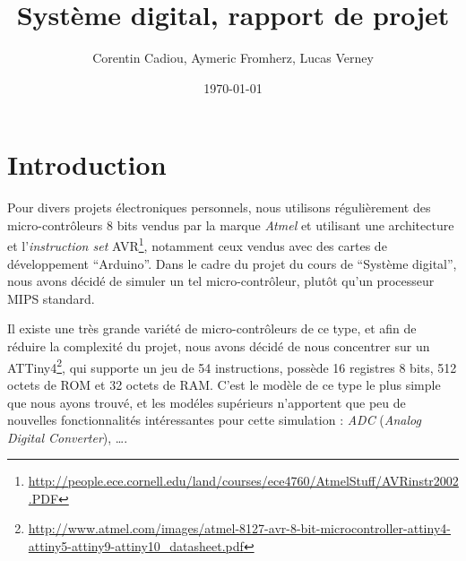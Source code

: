 \documentclass[11pt]{article}
\author{Corentin Cadiou, Aymeric Fromherz, Lucas Verney}
\date{\today}
\title{Système digital, rapport de projet}
\begin{document}
\maketitle
\section*{Introduction}
Pour divers projets électroniques personnels, nous utilisons régulièrement des micro-contrôleurs 8 bits vendus par la marque \emph{Atmel} et utilisant une architecture et l'\emph{instruction set} AVR\footnote{\url{http://people.ece.cornell.edu/land/courses/ece4760/AtmelStuff/AVRinstr2002.PDF}}, notamment ceux vendus avec des cartes de développement ``Arduino''. Dans le cadre du projet du cours de ``Système digital'', nous avons décidé de simuler un tel micro-contrôleur, plutôt qu'un processeur MIPS standard.

Il existe une très grande variété de micro-contrôleurs de ce type, et afin de réduire la complexité du projet, nous avons décidé de nous concentrer sur un ATTiny4\footnote{\url{http://www.atmel.com/images/atmel-8127-avr-8-bit-microcontroller-attiny4-attiny5-attiny9-attiny10_datasheet.pdf}}, qui supporte un jeu de 54 instructions, possède 16 registres 8 bits, 512 octets de ROM et 32 octets de RAM. C'est le modèle de ce type le plus simple que nous ayons trouvé, et les modéles supérieurs n'apportent que peu de nouvelles fonctionnalités intéressantes pour cette simulation : \emph{ADC} (\emph{Analog Digital Converter}), \dots.
\end{document}
